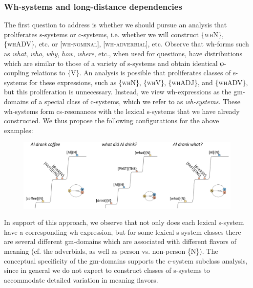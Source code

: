 \subsubsection{Wh-systems and long-distance dependencies}

The first question to address is whether we should pursue an analysis that proliferates s-systems or c-systems, i.e. whether we will construct \{\textsc{whN}\}, \{\textsc{whADV}\}, etc. or [\textsc{wh-nominal}], [\textsc{wh-adverbial}], etc. Observe that wh-forms such as \textit{what}, \textit{who}, \textit{why}, \textit{how}, \textit{where}, etc., when used for questions, have distributions which are similar to those of a variety of s-systems and obtain identical φ-coupling relations to \{V\}. An analysis is possible that proliferates classes of s-systems for these expressions, such as \{\textsc{whN}\}, \{\textsc{whV}\}, \{\textsc{whADJ}\}, and \{\textsc{whADV}\}, but this proliferation is unnecessary. Instead, we view wh-expressions as the gm-domains of a special class of c-systems, which we refer to as \textit{wh-systems.} These wh-systems form cs-resonances with the lexical s-systems that we have already constructed. We thus propose the following configurations for the above examples:

  
\begin{figure}
\includegraphics[width=\textwidth]{figures/Tilsen-img158.png}
\caption{\missingcaption}
\label{fig:}
\end{figure}
 

  In support of this approach, we observe that not only does each lexical s-system have a corresponding wh-expression, but for some lexical s-system classes there are several different gm-domains which are associated with different flavors of meaning (cf. the adverbials, as well as person vs. non-person \{N\}). The conceptual specificity of the gm-domains supports the c-system subclass analysis, since in general we do not expect to construct classes of s-systems to accommodate detailed variation in meaning flavors.


